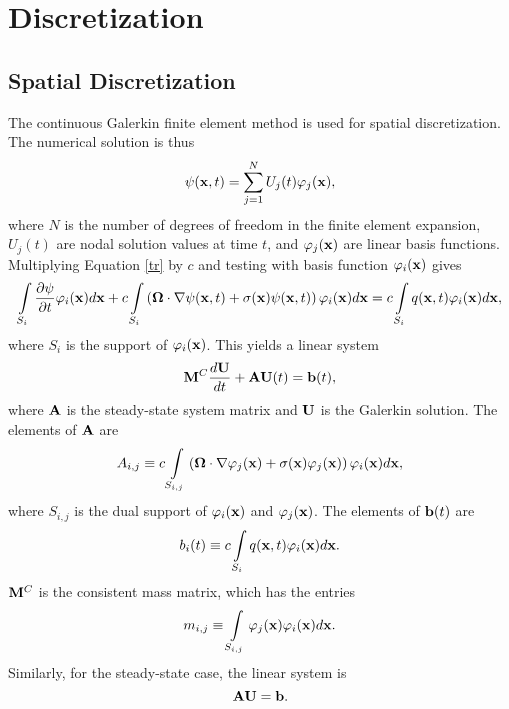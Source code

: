 \section{Discretization}
\subsection{Spatial Discretization}\label{galerkindef}
The continuous Galerkin finite element method is used for spatial discretization.
The numerical solution is thus
\begin{equation}
   \psi(\mathbf{x},t) = \sum\limits_{j=1}^N U_j(t) \varphi_j(\mathbf{x}),
\end{equation}
where $N$ is the number of degrees of freedom in the finite element expansion,
$U_j(t)$ are nodal solution values at time $t$, and $\varphi_j(\mathbf{x})$
are linear basis functions. Multiplying Equation \eqref{tr} by $c$ and testing
with basis function $\varphi_i(\mathbf{x})$ gives
\begin{equation}
   \int\limits_{S_i}\frac{\partial \psi}{\partial t}\varphi_i(\mathbf{x}) d\mathbf{x}
      + c\int\limits_{S_i}\left(\mathbf{\Omega}\cdot\nabla\psi(\mathbf{x},t)
      + \sigma(\mathbf{x})\psi(\mathbf{x},t)\right)\varphi_i(\mathbf{x}) d\mathbf{x}
      = c\int\limits_{S_i} q(\mathbf{x},t) \varphi_i(\mathbf{x}) d\mathbf{x},
\end{equation}
where $S_i$ is the support of $\varphi_i(\mathbf{x})$.
This yields a linear system
\begin{equation}\label{semidiscrete}
   \mathbf{M}^C\frac{d\mathbf{U}}{dt}+\mathbf{A} \mathbf{U}(t) = \mathbf{b}(t),
\end{equation}
where $\mathbf{A}$ is the steady-state system matrix and $\mathbf{U}$ is the
Galerkin solution. The elements of $\mathbf{A}$ are
\begin{equation}\label{Aij}
	A_{i,j} \equiv c\int\limits_{S_{i,j}}\left(
      \mathbf{\Omega}\cdot\nabla\varphi_j(\mathbf{x}) +
		\sigma(\mathbf{x})\varphi_j(\mathbf{x})\right)\varphi_i(\mathbf{x}) d\mathbf{x},
\end{equation}
where $S_{i,j}$ is the dual support of $\varphi_i(\mathbf{x})$ and $\varphi_j(\mathbf{x})$.
The elements of $\mathbf{b}(t)$ are
\begin{equation}
	b_i(t) \equiv c\int\limits_{S_i} q(\mathbf{x},t)\varphi_i(\mathbf{x}) d\mathbf{x}.
\end{equation}
$\mathbf{M}^C$ is the consistent mass matrix, which has the entries
\begin{equation}\label{massmatrix}
	m_{i,j} \equiv \int\limits_{S_{i,j}}
   \varphi_j(\mathbf{x})\varphi_i(\mathbf{x}) d\mathbf{x}.
\end{equation}
Similarly, for the steady-state case, the linear system is
\begin{equation}
  \mathbf{A}\mathbf{U} = \mathbf{b}.
\end{equation}
